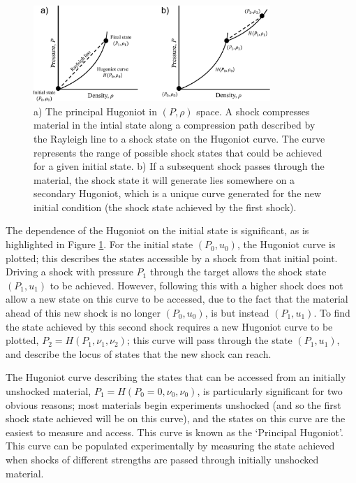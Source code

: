 \begin{figure}
\centering
\includegraphics[width=0.8\textwidth]{figures/Theory/SecondaryHugoniot.pdf}%
\caption{\label{fig:SecondaryHugoniot} a) The principal Hugoniot in $(P, \rho)$ space. A shock compresses material in the intial state along a compression path described by the Rayleigh line to a shock state on the Hugoniot curve. The curve represents the range of possible shock states that could be achieved for a given initial state. b) If a subsequent shock passes through the material, the shock state it will generate lies somewhere on a secondary Hugoniot, which is a unique curve generated for the new initial condition (the shock state achieved by the first shock).}
\end{figure}

The dependence of the Hugoniot on the initial state is significant, as is highlighted in Figure \ref{fig:SecondaryHugoniot}. For the initial state $(P_0, u_0)$, the Hugoniot curve is plotted; this describes the states accessible by a shock from that initial point. Driving a shock with pressure $P_1$ through the target allows the shock state $(P_1, u_1)$ to be achieved. However, following this with a higher shock does not allow a new state on this curve to be accessed, due to the fact that the material ahead of this new shock is no longer $(P_0, u_0)$, is but instead $(P_1, u_1)$. To find the state achieved by this second shock requires a new Hugoniot curve to be plotted, $P_2 = H(P_1, \nu_1, \nu_2)$; this curve will pass through the state $(P_1, u_1)$, and describe the locus of states that the new shock can reach.

The Hugoniot curve describing the states that can be accessed from an initially unshocked material, $P_1 = H(P_0 = 0, \nu_0, \nu_0)$, is particularly significant for two obvious reasons; most materials begin experiments unshocked (and so the first shock state achieved will be on this curve), and the states on this curve are the easiest to measure and access. This curve is known as the `Principal Hugoniot'. This curve can be populated experimentally by measuring the state achieved when shocks of different strengths are passed through initially unshocked material.

